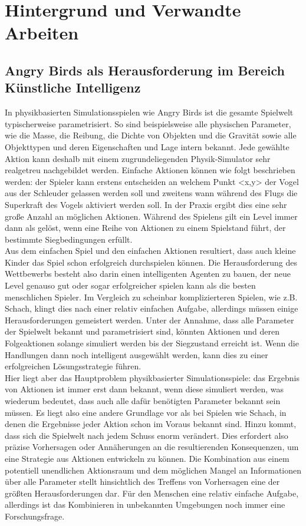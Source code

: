 \section{Hintergrund und Verwandte Arbeiten}

\subsection{Angry Birds als Herausforderung im Bereich Künstliche Intelligenz} 
In physikbasierten Simulationsspielen wie Angry Birds ist die gesamte Spielwelt typischerweise parametrisiert. So sind beispielsweise alle physischen Parameter, wie die Masse, die Reibung, die Dichte von Objekten und die Gravität sowie alle Objekttypen und deren Eigenschaften und Lage intern bekannt. Jede gewählte Aktion kann deshalb mit einem zugrundeliegenden Physik-Simulator sehr realgetreu nachgebildet werden. Einfache Aktionen können wie folgt beschrieben werden: der Spieler kann erstens entscheiden an welchem Punkt <x,y> der Vogel aus der Schleuder gelassen werden soll und zweitens wann während des Flugs die Superkraft des Vogels aktiviert werden soll. In der Praxis ergibt dies eine sehr gro\ss e Anzahl an möglichen Aktionen. Während des Spielens gilt ein Level immer dann als gelöst, wenn eine Reihe von Aktionen zu einem Spielstand führt, der bestimmte Siegbedingungen erfüllt. \cite{renz2015aibirds} \\
Aus dem einfachen Spiel und den einfachen Aktionen resultiert, dass auch kleine Kinder das Spiel schon erfolgreich durchspielen können. Die Herausforderung des Wettbewerbs besteht also darin einen intelligenten Agenten zu bauen, der neue Level genauso gut oder sogar erfolgreicher spielen kann als die besten menschlichen Spieler. Im Vergleich zu scheinbar komplizierteren Spielen, wie z.B. Schach, klingt dies nach einer relativ einfachen Aufgabe, allerdings müssen einige Herausforderungen gemeistert werden. Unter der Annahme, dass alle Parameter der Spielwelt bekannt und parametrisiert sind, könnten Aktionen und deren Folgeaktionen solange simuliert werden bis der Siegzustand erreicht ist. Wenn die Handlungen dann noch intelligent ausgewählt werden, kann dies zu einer erfolgreichen Lösungsstrategie führen.\\
Hier liegt aber das Hauptproblem physikbasierter Simulationsspiele: das Ergebnis von Aktionen ist immer erst dann bekannt, wenn diese simuliert werden, was wiederum bedeutet, dass auch alle dafür benötigten Parameter bekannt sein müssen. Es liegt also eine andere Grundlage vor als bei Spielen wie Schach, in denen die Ergebnisse jeder Aktion schon im Voraus bekannt sind. Hinzu kommt, dass sich die Spielwelt nach jedem Schuss enorm verändert. Dies erfordert also präzise Vorhersagen oder Annäherungen an die resultierenden Konsequenzen, um eine Strategie aus Aktionen entwickeln zu können. Die Kombination aus einem potentiell unendlichen Aktionsraum und dem möglichen Mangel an Informationen über alle Parameter stellt hinsichtlich des Treffens von Vorhersagen eine der grö\ss ten Herausforderungen dar. Für den Menschen eine relativ einfache Aufgabe, allerdings ist das Kombinieren in unbekannten Umgebungen noch immer eine Forschungsfrage.\\
